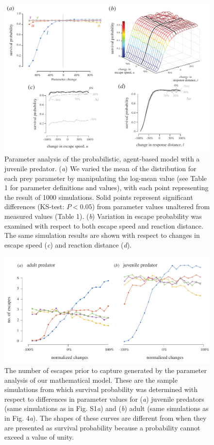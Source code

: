 \documentclass[11pt]{article}
\begin{document}
\linespread{1}\selectfont %


\begin{figure}[!h]
\centering
	\includegraphics[width=5.5in]{supp_sense}
\caption{Parameter analysis of the probabilistic, agent-based model with a juvenile predator. 
(\textit{a}) We varied the mean of the distribution for each prey parameter by manipulating the log-mean value (see Table 1 for parameter definitions and values), with each point representing the result of 1000 simulations. 
Solid points represent significant differences (KS-test: $P < 0.05$) from parameter values unaltered from measured values (Table 1).
(\textit{b}) Variation in escape probability was examined with respect to both escape speed and reaction distance.
The same simulation results are shown with respect to changes in escape speed (\textit{c}) and reaction distance (\textit{d}).
}
\label{fig_sense}
\end{figure}

\begin{figure}[!h]
\centering
	\includegraphics[width=5.5in]{supp_noescape}
\caption{The number of escapes prior to capture generated by the parameter analysis of our mathematical model.
These are the sample simulations from which survival probability was determined with respect to differences in parameter values for (\textit{a}) juvenile predators (same simulations as in Fig. S1\textit{a}) and (\textit{b}) adult (same simulations as in Fig. 4\textit{a}).
The shapes of these curves are different from when they are presented as survival probability because a probability cannot exceed a value of unity.
}
\label{fig_sense}
\end{figure}
\end{document}
